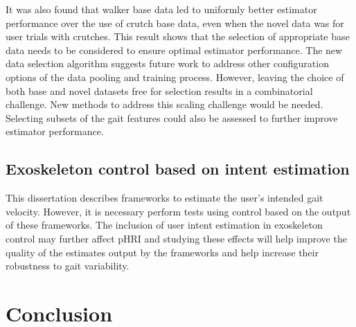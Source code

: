 It was also found that walker base data led to uniformly better estimator performance over the use of crutch base data, even when the novel data was for user trials with crutches. This result shows that the selection of appropriate base data needs to be considered to ensure optimal estimator performance. The new data selection algorithm suggests future work to address other configuration options of the data pooling and training process. However, leaving the choice of both base and novel datasets free for selection results in a combinatorial challenge. New methods to address this scaling challenge would be needed. Selecting subsets of the gait features could also be assessed to further improve estimator performance.

\subsection{Exoskeleton control based on intent estimation}

This dissertation describes frameworks to estimate the user's intended gait velocity. However, it is necessary perform tests using control based on the output of these frameworks. The inclusion of user intent estimation in exoskeleton control may further affect pHRI and studying these effects will help improve the quality of the estimates output by the frameworks and help increase their robustness to gait variability.

\section{Conclusion}
%

